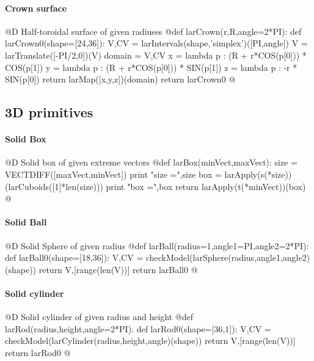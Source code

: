 \documentclass[11pt,oneside]{article}	%
\begin{document}
\paragraph{Crown surface}
@D Half-toroidal surface of given radiuses
@{def larCrown(r,R,angle=2*PI):
	def larCrown0(shape=[24,36]):
		V,CV = larIntervals(shape,'simplex')([PI,angle])
		V = larTranslate([-PI/2,0])(V)
		domain = V,CV
		x = lambda p : (R + r*COS(p[0])) * COS(p[1])
		y = lambda p : (R + r*COS(p[0])) * SIN(p[1])
		z = lambda p : -r * SIN(p[0])
		return larMap([x,y,z])(domain)
	return larCrown0
@}

\subsection{3D primitives}


\paragraph{Solid Box}
@D Solid box of given extreme vectors
@{def larBox(minVect,maxVect):
	size = VECTDIFF([maxVect,minVect])
	print "size =",size
	box = larApply(s(*size))(larCuboids([1]*len(size)))
	print "box =",box
	return larApply(t(*minVect))(box)
@}


\paragraph{Solid Ball}
@D Solid Sphere of given radius
@{def larBall(radius=1,angle1=PI,angle2=2*PI):
	def larBall0(shape=[18,36]):
		V,CV = checkModel(larSphere(radius,angle1,angle2)(shape))
		return V,[range(len(V))]
	return larBall0
@}

\paragraph{Solid cylinder}
@D Solid cylinder of given radius and height
@{def larRod(radius,height,angle=2*PI):
	def larRod0(shape=[36,1]):
		V,CV = checkModel(larCylinder(radius,height,angle)(shape))
		return V,[range(len(V))]
	return larRod0
@}
\end{document}
